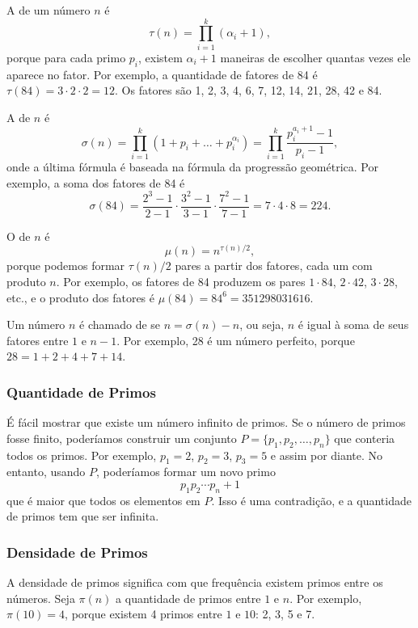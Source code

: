 A  de um número $n$ é
\[\tau(n)=\prod_{i=1}^k (\alpha_i+1),\]
porque para cada primo $p_i$, existem $\alpha_i+1$ maneiras de escolher quantas vezes ele aparece no fator. Por exemplo, a quantidade de fatores de 84 é $\tau(84)=3 \cdot 2 \cdot 2 = 12$. Os fatores são 1, 2, 3, 4, 6, 7, 12, 14, 21, 28, 42 e 84.

A  de $n$ é
\[\sigma(n)=\prod_{i=1}^k (1+p_i+\ldots+p_i^{\alpha_i}) = \prod_{i=1}^k \frac{p_i^{a_i+1}-1}{p_i-1},\]
onde a última fórmula é baseada na fórmula da progressão geométrica. Por exemplo, a soma dos fatores de 84 é
\[\sigma(84)=\frac{2^3-1}{2-1} \cdot \frac{3^2-1}{3-1} \cdot \frac{7^2-1}{7-1} = 7 \cdot 4 \cdot 8 = 224.\]

O  de $n$ é
\[\mu(n)=n^{\tau(n)/2},\]
porque podemos formar $\tau(n)/2$ pares a partir dos fatores, cada um com produto $n$. Por exemplo, os fatores de 84 produzem os pares $1 \cdot 84$, $2 \cdot 42$, $3 \cdot 28$, etc., e o produto dos fatores é $\mu(84)=84^6=351298031616$.


Um número $n$ é chamado de  se $n=\sigma(n)-n$, ou seja, $n$ é igual à soma de seus fatores entre $1$ e $n-1$. Por exemplo, 28 é um número perfeito, porque $28=1+2+4+7+14$.

\subsubsection{Quantidade de Primos}

É fácil mostrar que existe um número infinito de primos. Se o número de primos fosse finito, poderíamos construir um conjunto $P=\{p_1,p_2,\ldots,p_n\}$ que conteria todos os primos. Por exemplo, $p_1=2$, $p_2=3$, $p_3=5$ e assim por diante. No entanto, usando $P$, poderíamos formar um novo primo
\[p_1 p_2 \cdots p_n+1\]
que é maior que todos os elementos em $P$. Isso é uma contradição, e a quantidade de primos tem que ser infinita.

\subsubsection{Densidade de Primos}

A densidade de primos significa com que frequência existem primos entre os números. Seja $\pi(n)$ a quantidade de primos entre $1$ e $n$. Por exemplo, $\pi(10)=4$, porque existem 4 primos entre $1$ e $10$: 2, 3, 5 e 7.


